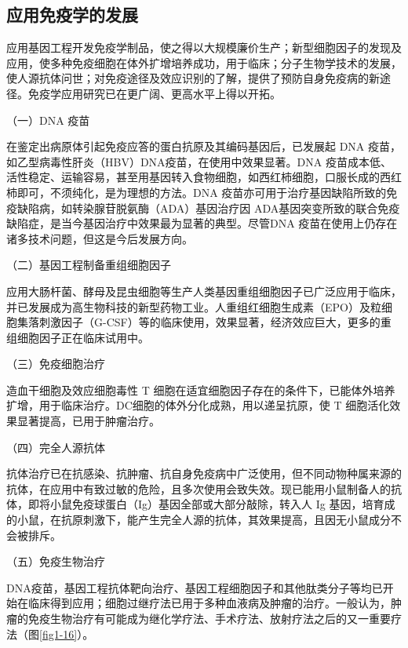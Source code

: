 \subsection{应用免疫学的发展}

应用基因工程开发免疫学制品，使之得以大规模廉价生产；新型细胞因子的发现及应用，使多种免疫细胞在体外扩增培养成功，用于临床；分子生物学技术的发展，使人源抗体问世；对免疫途径及效应识别的了解，提供了预防自身免疫病的新途径。免疫学应用研究已在更广阔、更高水平上得以开拓。

（一）DNA 疫苗

在鉴定出病原体引起免疫应答的蛋白抗原及其编码基因后，已发展起 DNA
疫苗，如乙型病毒性肝炎（HBV）DNA疫苗，在使用中效果显著。DNA
疫苗成本低、活性稳定、运输容易，甚至用基因转入食物细胞，如西红柿细胞，口服长成的西红柿即可，不须纯化，是为理想的方法。DNA
疫苗亦可用于治疗基因缺陷所致的免疫缺陷病，如转染腺苷脱氨酶（ADA）基因治疗因
ADA基因突变所致的联合免疫缺陷症，是当今基因治疗中效果最为显著的典型。尽管DNA
疫苗在使用上仍存在诸多技术问题，但这是今后发展方向。

（二）基因工程制备重组细胞因子

应用大肠杆菌、酵母及昆虫细胞等生产人类基因重组细胞因子已广泛应用于临床，并已发展成为高生物科技的新型药物工业。人重组红细胞生成素（EPO）及粒细胞集落刺激因子（G-CSF）等的临床使用，效果显著，经济效应巨大，更多的重组细胞因子正在临床试用中。

（三）免疫细胞治疗

造血干细胞及效应细胞毒性 T
细胞在适宜细胞因子存在的条件下，已能体外培养扩增，用于临床治疗。DC细胞的体外分化成熟，用以递呈抗原，使
T 细胞活化效果显著提高，已用于肿瘤治疗。

（四）完全人源抗体

抗体治疗已在抗感染、抗肿瘤、抗自身免疫病中广泛使用，但不同动物种属来源的抗体，在应用中有致过敏的危险，且多次使用会致失效。现已能用小鼠制备人的抗体，即将小鼠免疫球蛋白（Ig）基因全部或大部分敲除，转入人
Ig
基因，培育成的小鼠，在抗原刺激下，能产生完全人源的抗体，其效果提高，且因无小鼠成分不会被排斥。

（五）免疫生物治疗

DNA疫苗，基因工程抗体靶向治疗、基因工程细胞因子和其他肽类分子等均已开始在临床得到应用；细胞过继疗法已用于多种血液病及肿瘤的治疗。一般认为，肿瘤的免疫生物治疗有可能成为继化学疗法、手术疗法、放射疗法之后的又一重要疗法（图\ref{fig1-16}）。


